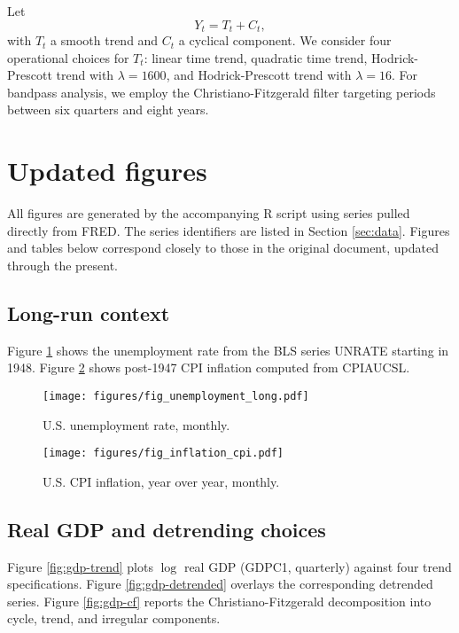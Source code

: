 \documentclass[11pt]{article}
\begin{document}
Let
\begin{equation}
Y_t = T_t + C_t, \label{eq:trend-cycle}
\end{equation}
with $T_t$ a smooth trend and $C_t$ a cyclical component. We consider four operational choices for $T_t$: linear time trend, quadratic time trend, Hodrick-Prescott trend with $\lambda=1600$, and Hodrick-Prescott trend with $\lambda=16$. For bandpass analysis, we employ the Christiano-Fitzgerald filter targeting periods between six quarters and eight years.

\section{Updated figures}

All figures are generated by the accompanying R script using series pulled directly from FRED. The series identifiers are listed in Section \ref{sec:data}. Figures and tables below correspond closely to those in the original document, updated through the present.

\subsection{Long-run context}

Figure \ref{fig:unemp} shows the unemployment rate from the BLS series UNRATE starting in 1948. Figure \ref{fig:infl} shows post-1947 CPI inflation computed from CPIAUCSL.

\begin{figure}[h]
\centering
\texttt{[image: figures/fig\_unemployment\_long.pdf]}
\caption{U.S. unemployment rate, monthly.}
\label{fig:unemp}
\end{figure}

\begin{figure}[h]
\centering
\texttt{[image: figures/fig\_inflation\_cpi.pdf]}
\caption{U.S. CPI inflation, year over year, monthly.}
\label{fig:infl}
\end{figure}

\subsection{Real GDP and detrending choices}

Figure \ref{fig:gdp-trend} plots $\log$ real GDP (GDPC1, quarterly) against four trend specifications. Figure \ref{fig:gdp-detrended} overlays the corresponding detrended series. Figure \ref{fig:gdp-cf} reports the Christiano-Fitzgerald decomposition into cycle, trend, and irregular components.
\end{document}
